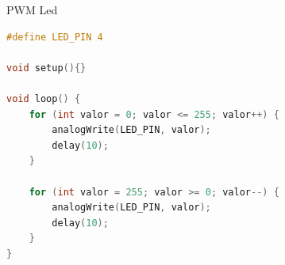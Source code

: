 \begin{frame}[fragile]{PWM Led}
\begin{lstlisting}[language=C, basicstyle=\tiny\ttfamily]
#define LED_PIN 4

void setup(){}

void loop() {
    for (int valor = 0; valor <= 255; valor++) {
        analogWrite(LED_PIN, valor);
        delay(10);
    }

    for (int valor = 255; valor >= 0; valor--) {
        analogWrite(LED_PIN, valor);
        delay(10);
    }
}
\end{lstlisting}
\end{frame}
    
    